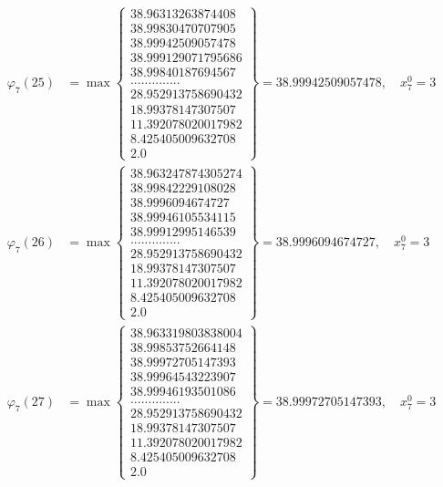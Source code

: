 \documentclass{article}
\begin{document}
\begin{align*}
  
  
  
\varphi_{7}(25) &= \max \left\{ \begin{array}{c}
38.96313263874408 \\
 38.99830470707905 \\
 38.99942509057478 \\
 38.999129071795686 \\
 38.99840187694567 \\
 .............. \\
 28.952913758690432 \\
 18.99378147307507 \\
 11.392078020017982 \\
 8.425405009632708 \\
 2.0
\end{array} \right\} = 38.99942509057478, \quad x_{7}^0 = 3\\
  
  
  
  
\varphi_{7}(26) &= \max \left\{ \begin{array}{c}
38.963247874305274 \\
 38.99842229108028 \\
 38.9996094674727 \\
 38.99946105534115 \\
 38.99912995146539 \\
 .............. \\
 28.952913758690432 \\
 18.99378147307507 \\
 11.392078020017982 \\
 8.425405009632708 \\
 2.0
\end{array} \right\} = 38.9996094674727, \quad x_{7}^0 = 3\\
  
  
  
  
\varphi_{7}(27) &= \max \left\{ \begin{array}{c}
38.963319803838004 \\
 38.99853752664148 \\
 38.99972705147393 \\
 38.99964543223907 \\
 38.99946193501086 \\
 .............. \\
 28.952913758690432 \\
 18.99378147307507 \\
 11.392078020017982 \\
 8.425405009632708 \\
 2.0
\end{array} \right\} = 38.99972705147393, \quad x_{7}^0 = 3\\
  

\end{align*}
\end{document}
